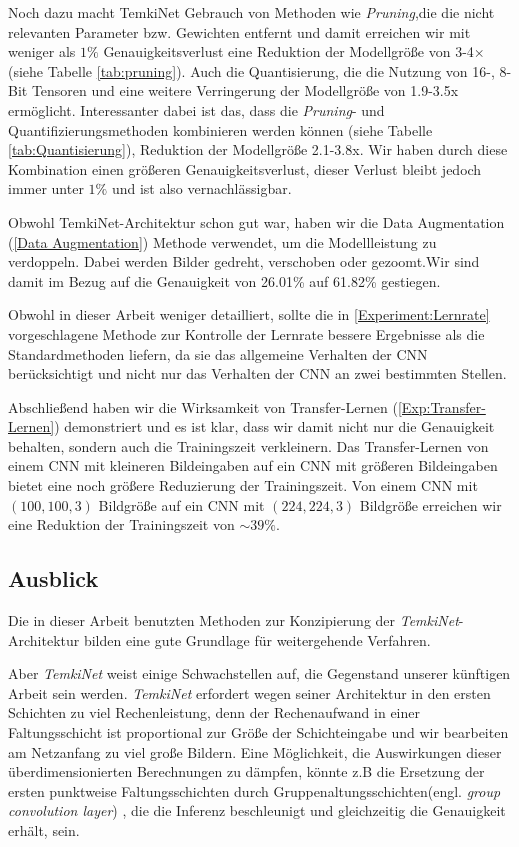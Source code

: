 \documentclass[12pt,a4paper]{scrartcl}
\numberwithin{equation}{section}
\begin{document}
Noch dazu macht TemkiNet Gebrauch von Methoden wie \textit{Pruning},die die nicht relevanten Parameter bzw. Gewichten entfernt und damit erreichen wir  mit weniger als $ 1\% $ Genauigkeitsverlust eine Reduktion der Modellgröße von  3-4$\times $ (siehe Tabelle \ref{tab:pruning}). Auch die Quantisierung, die die Nutzung von 16-, 8-Bit Tensoren und eine weitere Verringerung der Modellgröße von 1.9-3.5x ermöglicht. Interessanter dabei ist das, dass die \textit{Pruning}- und Quantifizierungsmethoden kombinieren werden können (siehe Tabelle \ref{tab:Quantisierung}), Reduktion der Modellgröße 2.1-3.8x. Wir haben durch diese Kombination einen größeren Genauigkeitsverlust, dieser Verlust bleibt jedoch immer unter $ 1\% $ und ist also vernachlässigbar.

Obwohl TemkiNet-Architektur schon gut war, haben wir die Data Augmentation (\ref{Data Augmentation}) Methode verwendet, um die Modellleistung zu verdoppeln. Dabei werden Bilder gedreht, verschoben oder gezoomt.Wir sind damit im Bezug auf die Genauigkeit von 26.01\% auf 61.82\% gestiegen.

Obwohl in dieser Arbeit weniger detailliert, sollte die in \ref{Experiment:Lernrate} vorgeschlagene Methode zur Kontrolle der Lernrate bessere Ergebnisse als die Standardmethoden liefern, da sie das allgemeine Verhalten der CNN berücksichtigt und nicht nur das Verhalten der CNN an zwei bestimmten Stellen.

Abschließend haben wir die Wirksamkeit von Transfer-Lernen (\ref{Exp:Transfer-Lernen}) demonstriert und es ist klar, dass wir damit nicht nur die Genauigkeit behalten, sondern auch die Trainingszeit verkleinern. Das Transfer-Lernen von einem CNN mit kleineren Bildeingaben auf ein CNN mit größeren Bildeingaben bietet eine noch größere Reduzierung der Trainingszeit. Von einem CNN mit $ (100, 100, 3) $  Bildgröße auf ein CNN mit $ (224,224,3) $ Bildgröße  erreichen wir eine Reduktion der Trainingszeit von $ \sim39\% $.

\subsection{Ausblick}

Die in dieser Arbeit benutzten Methoden zur Konzipierung der \textit{TemkiNet}-Architektur bilden eine gute Grundlage für weitergehende Verfahren. 

Aber \textit{TemkiNet} weist einige Schwachstellen auf, die Gegenstand unserer künftigen Arbeit sein werden. \textit{TemkiNet} erfordert wegen seiner Architektur in den ersten Schichten zu viel Rechenleistung, denn der Rechenaufwand in einer Faltungsschicht ist proportional zur Größe der Schichteingabe und wir bearbeiten am Netzanfang zu viel große Bildern. Eine Möglichkeit, die Auswirkungen dieser überdimensionierten Berechnungen zu dämpfen, könnte z.B die Ersetzung der ersten punktweise Faltungsschichten durch Gruppenaltungsschichten(engl. \textit{group convolution layer}) \cite{AlexNet}, die die Inferenz beschleunigt und gleichzeitig die Genauigkeit erhält, sein.
\end{document}

